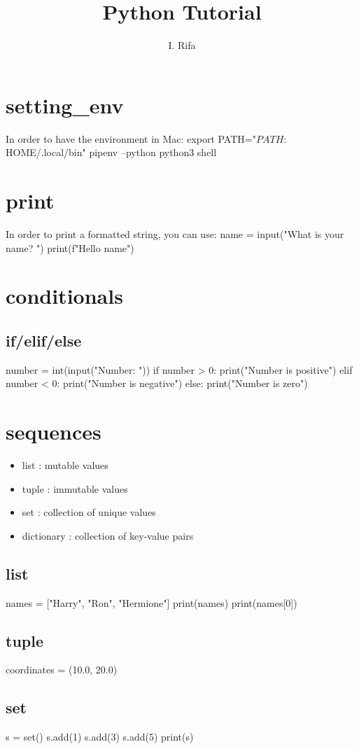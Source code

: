 \documentclass[12pt]{article}
\title{Python Tutorial}
\author{I. Rifa}
\begin{document}
\maketitle

\section{setting_env}
In order to have the environment in Mac:
export PATH="$PATH:$HOME/.local/bin"
pipenv --python python3 shell


\section{print}

In order to print a formatted string, you can use:
name = input("What is your name? ")
print(f"Hello {name}")

\section{conditionals}
\subsection{if/elif/else}
number = int(input("Number: "))
if number > 0:
    print("Number is positive")
elif number < 0:
    print("Number is negative")
else:
    print("Number is zero")

\section{sequences}
\begin{itemize}
    \item list : mutable values
    \item tuple : immutable values
    \item set : collection of unique values
    \item dictionary : collection of key-value pairs
\end{itemize}

\subsection{list}
names = ["Harry", "Ron", "Hermione"]
print(names)
print(names[0])
\subsection{tuple}
coordinates = (10.0, 20.0)
\subsection{set}
s = set()
s.add(1)
s.add(3)
s.add(5)
print(s)
\end{document}
